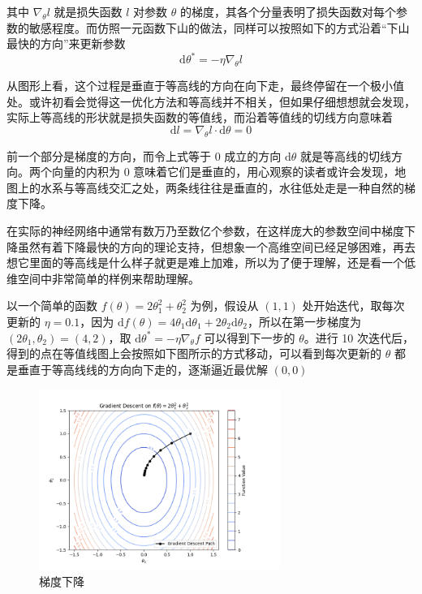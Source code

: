 其中 $\nabla_\theta l$ 就是损失函数 $l$ 对参数 $\theta$ 的梯度，其各个分量表明了损失函数对每个参数的敏感程度。而仿照一元函数下山的做法，同样可以按照如下的方式沿着“下山最快的方向”来更新参数
\[
    \mathrm{d}\theta^* = -\eta \nabla_\theta l
\]

从图形上看，这个过程是垂直于等高线的方向在向下走，最终停留在一个极小值处。或许初看会觉得这一优化方法和等高线并不相关，但如果仔细想想就会发现，实际上等高线的形状就是损失函数的等值线，而沿着等值线的切线方向意味着
\[
    \mathrm{d}l = \nabla_\theta l \cdot \mathrm{d}\theta = 0
\]

前一个部分是梯度的方向，而令上式等于 $0$ 成立的方向 $\mathrm{d}\theta$ 就是等高线的切线方向。两个向量的内积为 $0$ 意味着它们是垂直的，用心观察的读者或许会发现，地图上的水系与等高线交汇之处，两条线往往是垂直的，水往低处走是一种自然的梯度下降。

在实际的神经网络中通常有数万乃至数亿个参数，在这样庞大的参数空间中梯度下降虽然有着下降最快的方向的理论支持，但想象一个高维空间已经足够困难，再去想它里面的等高线是什么样子就更是难上加难，所以为了便于理解，还是看一个低维空间中非常简单的样例来帮助理解。

以一个简单的函数 $f(\theta) = 2\theta_1^2 + \theta_2^2$ 为例，假设从 $(1, 1)$ 处开始迭代，取每次更新的 $\eta = 0.1$，因为 $\mathrm{d}f(\theta) = 4\theta_1 \mathrm{d}\theta_1 + 2\theta_2 \mathrm{d}\theta_2$，所以在第一步梯度为 $(2\theta_1, \theta_2) = (4, 2)$，取 $\mathrm{d}\theta^* = -\eta \nabla_\theta f$ 可以得到下一步的 $\theta$。进行 10 次迭代后，得到的点在等值线图上会按照如下图所示的方式移动，可以看到每次更新的 $\theta$ 都是垂直于等高线线的方向向下走的，逐渐逼近最优解 $(0, 0)$
\begin{figure}[H]
    \centering
    \includegraphics[width=0.7\textwidth]{img/gradient_descent.png}
    \caption{梯度下降}
\end{figure}

